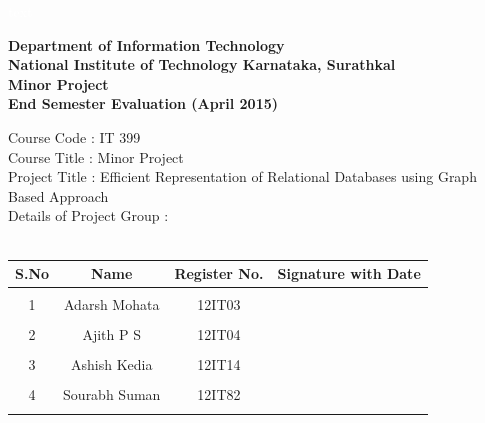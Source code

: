 \documentclass[12pt, oneside]{book}
\newcommand{\project}{Efficient Representation of Relational Databases using Graph Based Approach}
\begin{document}
 \pagebreak \textcolor{white}{text}
\thispagestyle{empty}
\begin{center}
\Large
\textbf{Department of Information Technology} \\
\normalsize
\textbf{National Institute of Technology Karnataka, Surathkal} \\
\vspace{1cm} \Large
\textbf{Minor Project} \\ \vspace{0.5cm}
\textbf{End Semester Evaluation (April 2015)}
\vspace{1cm}
\end{center}
Course Code : IT 399 \\
Course Title : Minor Project \\
Project Title : \project \\
Details of Project Group : \\
\vspace{5mm}
\\
\begin{table}[h!]
  \begin{center}
   \begin{tabular}{ p{} | p{} | p{} | p{} }
      \hline
      \multicolumn{1}{|c|}{\textbf{S.No}} & \multicolumn{1}{c|}{\textbf{Name}} & \multicolumn{1}{c|}{\textbf{Register No.}} & \multicolumn{1}{c|}{\textbf{Signature with Date}} \\ \hline
      \multicolumn{1}{c}{} & \multicolumn{1}{c}{} & \multicolumn{1}{c}{} & \multicolumn{1}{c}{\hspace{4cm}}\\
      \multicolumn{1}{c}{1} & \multicolumn{1}{c}{Adarsh Mohata} & \multicolumn{1}{c}{12IT03} & \multicolumn{1}{c}{}\\
      \multicolumn{1}{c}{} & \multicolumn{1}{c}{} & \multicolumn{1}{c}{} & \multicolumn{1}{c}{}\\
      \multicolumn{1}{c}{2} & \multicolumn{1}{c}{Ajith P S} & \multicolumn{1}{c}{12IT04} & \multicolumn{1}{c}{}\\
      \multicolumn{1}{c}{} & \multicolumn{1}{c}{} & \multicolumn{1}{c}{} & \multicolumn{1}{c}{}\\
      \multicolumn{1}{c}{3} & \multicolumn{1}{c}{Ashish Kedia} & \multicolumn{1}{c}{12IT14} & \multicolumn{1}{c}{}\\
      \multicolumn{1}{c}{} & \multicolumn{1}{c}{} & \multicolumn{1}{c}{} & \multicolumn{1}{c}{}\\
      \multicolumn{1}{c}{4} & \multicolumn{1}{c}{Sourabh Suman} & \multicolumn{1}{c}{12IT82} & \multicolumn{1}{c}{}\\
      \multicolumn{1}{c}{} & \multicolumn{1}{c}{} & \multicolumn{1}{c}{} & \multicolumn{1}{c}{}\\
   \end{tabular}

  \end{center}

\end{table}
\end{document}
